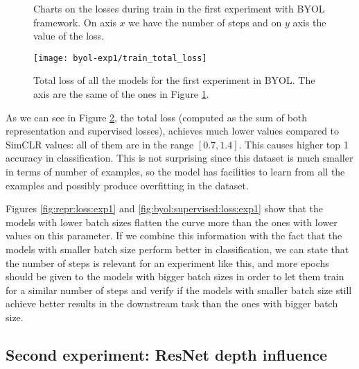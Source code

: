 \begin{figure}[htp] 
    \centering
    \hfill%
        \caption{Charts on the losses during train in the first experiment with BYOL framework. On axis $x$ we have the number of steps and on $y$ axis the value of the loss.}
        \label{fig:byol:exp1:both:losses}
\end{figure}

\begin{figure}[H]
\centering
\texttt{[image: byol-exp1/train\_total\_loss]}%
\caption{Total loss of all the models for the first experiment in BYOL. The axis are the same of the ones in Figure \ref{fig:byol:exp1:both:losses}. }
\label{fig:byol:total:loss:exp1}%
\end{figure}

As we can see in Figure \ref{fig:byol:total:loss:exp1}, the total loss (computed as the sum of both representation and supervised losses), achieves much lower values compared to SimCLR values: all of them are in the range $[0.7,1.4]$. This causes higher top 1 accuracy in classification. This is not surprising since this dataset is much smaller in terms of number of examples, so the model has facilities to learn from all the examples and possibly produce overfitting in the dataset.

Figures \ref{fig:repr:loss:exp1} and \ref{fig:byol:supervised:loss:exp1} show that the models with lower batch sizes flatten the curve more than the ones with lower values on this parameter. If we combine this information with the fact that the models with smaller batch size perform better in classification, we can state that the number of steps is relevant for an experiment like this, and more epochs should be given to the models with bigger batch sizes in order to let them train for a similar number of steps and verify if the models with smaller batch size still achieve better results in the downstream task than the ones with bigger batch size.


\subsection{Second experiment: ResNet depth influence}
\label{byol:second:experiment}

